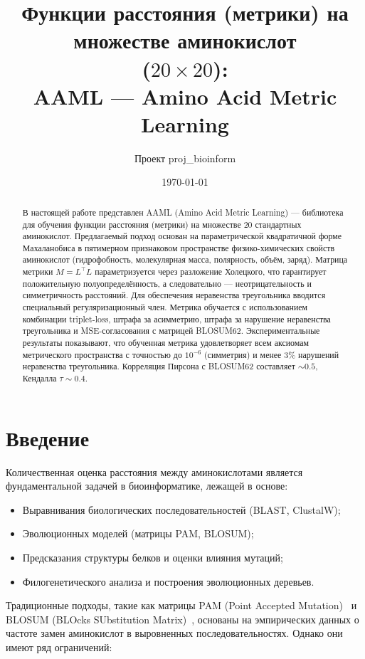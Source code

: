 \documentclass[12pt]{article}
\title{Функции расстояния (метрики) на множестве аминокислот\\ ($20 \times 20$):\\ AAML --- Amino Acid Metric Learning}
\author{Проект proj\_bioinform}
\date{\today}
\begin{document}
\maketitle

\begin{abstract}
В настоящей работе представлен AAML (Amino Acid Metric Learning) --- библиотека для обучения функции расстояния (метрики) на множестве 20 стандартных аминокислот. Предлагаемый подход основан на параметрической квадратичной форме Махаланобиса в пятимерном признаковом пространстве физико-химических свойств аминокислот (гидрофобность, молекулярная масса, полярность, объём, заряд). Матрица метрики $M = L^{\top}L$ параметризуется через разложение Холецкого, что гарантирует положительную полуопределённость, а следовательно --- неотрицательность и симметричность расстояний. Для обеспечения неравенства треугольника вводится специальный регуляризационный член. Метрика обучается с использованием комбинации triplet-loss, штрафа за асимметрию, штрафа за нарушение неравенства треугольника и MSE-согласования с матрицей BLOSUM62. Экспериментальные результаты показывают, что обученная метрика удовлетворяет всем аксиомам метрического пространства с точностью до $10^{-6}$ (симметрия) и менее 3\% нарушений неравенства треугольника. Корреляция Пирсона с BLOSUM62 составляет $\sim 0.5$, Кендалла $\tau \sim 0.4$.
\end{abstract}

\section{Введение}

Количественная оценка расстояния между аминокислотами является фундаментальной задачей в биоинформатике, лежащей в основе:
\begin{itemize}
    \item Выравнивания биологических последовательностей (BLAST, ClustalW);
    \item Эволюционных моделей (матрицы PAM, BLOSUM);
    \item Предсказания структуры белков и оценки влияния мутаций;
    \item Филогенетического анализа и построения эволюционных деревьев.
\end{itemize}

Традиционные подходы, такие как матрицы PAM (Point Accepted Mutation)~\cite{dayhoff1978} и BLOSUM (BLOcks SUbstitution Matrix)~\cite{henikoff1992}, основаны на эмпирических данных о частоте замен аминокислот в выровненных последовательностях. Однако они имеют ряд ограничений:
\end{document}
